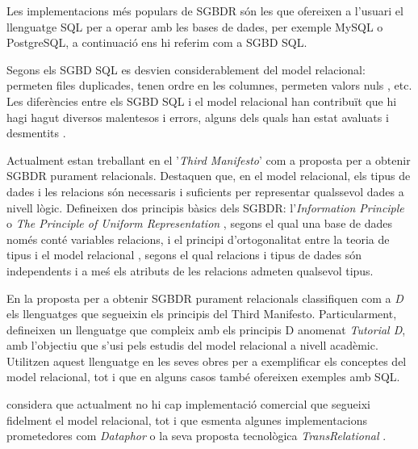 Les implementacions més populars de SGBDR són les que ofereixen a
l'usuari el llenguatge SQL per a operar amb les bases de dades, per
exemple MySQL o PostgreSQL, a continuació ens hi referim com a SGBD
SQL.  

Segons \textcite{datedarwen13:notosql_notonosql} els SGBD SQL es
desvien considerablement del model relacional: permeten files
duplicades, tenen ordre en les columnes, permeten valors
nuls \parencite{date08:nulls}, etc.  Les diferències entre els SGBD
SQL i el model relacional han contribuït que hi hagi hagut diversos
malentesos i errors, alguns dels quals han estat avaluats i
desmentits \parencite{dbdebunk,date06}.
  

Actualment \textcite{date:thethirdmanifesto} estan treballant en el
'\emph{Third Manifesto}' com a proposta per a obtenir SGBDR purament
relacionals. Destaquen que, en el model relacional, els tipus de dades
i les relacions són necessaris i suficients per representar qualssevol
dades a nivell lògic. %
Defineixen dos principis bàsics dels SGBDR: l'\emph{Information
  Principle} o \emph{The Principle of Uniform
  Representation} \parencite{date:dictionary}, segons el qual una base
de dades només conté variables relacions, i el principi
d'ortogonalitat entre la teoria de tipus i el model
relacional \parencite[cap.~6]{date06}, segons el qual relacions i
tipus de dades són independents i a meś els atributs de les relacions
admeten qualsevol tipus.  

En la proposta per a obtenir SGBDR purament relacionals
\textcite{date06:_datab_types_relat_model,date:tutoriald} classifiquen
com a \emph{D} els llenguatges que segueixin els principis del Third
Manifesto. Particularment, defineixen un llenguatge que compleix amb
els principis D anomenat \emph{Tutorial D}, amb l'objectiu que s'usi
pels estudis del model relacional a nivell acadèmic. Utilitzen aquest
llenguatge en les seves obres per a exemplificar els conceptes
del model relacional, tot i que en alguns casos també ofereixen
exemples amb SQL.


\textcite[cap.~2]{date06} %
considera que actualment no hi cap implementació comercial que
segueixi fidelment el model relacional, tot i que esmenta algunes
implementacions prometedores com \emph{Dataphor} o la seva proposta
tecnològica \emph{TransRelational} \parencite{date:transrelational}.

